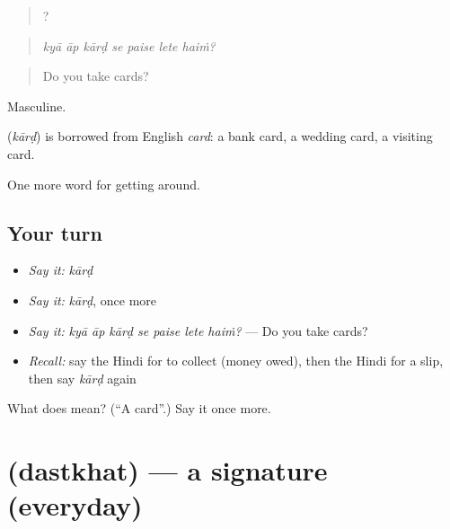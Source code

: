 \begin{quote}
      ?
\end{quote}

\begin{quote}
\emph{kyā āp kārḍ se paise lete haiṁ?}
\end{quote}

\begin{quote}
Do you take cards?
\end{quote}

Masculine.

\begin{cousinweb}
\textbf{} (\emph{kārḍ}) is borrowed from English \emph{card}: a bank card, a wedding card, a visiting card.
\end{cousinweb}

\begin{grammarlens}[title={What you've built}]
One more word for getting around.
\end{grammarlens}

\subsection*{Your turn}
\begin{itemize}
\raggedright
  \item \emph{Say it:} \emph{kārḍ}
  \item \emph{Say it:} \emph{kārḍ}, once more
  \item \emph{Say it:} \emph{kyā āp kārḍ se paise lete haiṁ?} — Do you take cards?
  \item \emph{Recall:} say the Hindi for to collect (money owed), then the Hindi for a slip, then say \emph{kārḍ} again
\end{itemize}

\begin{tcolorbox}[breakable,colback=teal!4,colframe=teal!35!black,title={Before you move on}]
What does  mean? (\textquotedblleft{}A card\textquotedblright{}.) Say it once more.
\end{tcolorbox}
\section[\texorpdfstring{\hi{दस्तख़त} (dastkhat)}{दस्तख़त (dastkhat)}]{ (dastkhat) — a signature (everyday)}

\label{lesson:HI-C429-dastkhat}



